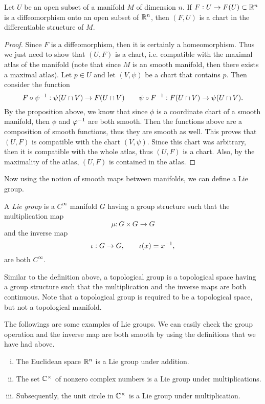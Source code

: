 \begin{proposition}
	Let $ U $ be an open subset of a manifold $ M $ of dimension $ n $. If $ F: U \to F(U) \subset \mathbb{R}^n $ is a diffeomorphism onto an open subset of $ \mathbb{R}^n $, then $ (F,U) $ is a chart in the differentiable structure of $ M $.
\end{proposition}
\begin{proof}
	Since $ F $ is a diffeomorphism, then it is certainly a homeomorphism. 
	Thus we just need to show that $ (U,F) $ is a chart, i.e. compatible with the maximal atlas of the manifold (note that since $ M $ is an smooth manifold, then there exists a maximal atlas). Let $ p \in  U $ and let $ (V,\psi) $ be a chart that contains $ p $. Then consider the function
	\[ F \circ \psi^{-1}: \psi(U\cap V) \to F(U\cap V) \qquad \psi\circ F^{-1}: F(U\cap V) \to \psi(U\cap V). \]
	By the proposition above, we know that since $ \phi $ is a coordinate chart of a smooth manifold, then $ \phi $ and $ \varphi^{-1} $ are both smooth. Then the functions above are a composition of smooth functions, thus they are smooth as well. This proves that $ (U,F) $ is compatible with the chart $ (V,\psi) $. Since this chart was arbitrary, then it is compatible with the whole atlas, thus $ (U,F) $ is a chart. Also, by the maximality of the atlas, $  (U,F) $ is contained in the atlas.
\end{proof}

Now using the notion of smooth maps between manifolds, we can define a Lie group.
\begin{definition}
	A \emph{Lie group} is a $ C^\infty $ manifold $ G $ having a group structure such that the multiplication map
	\[ \mu: G\times G \to G \]
	and the inverse map
	\[ \iota: G\to G, \qquad \iota(x) = x^{-1}, \]
	are both $ C^\infty $.
\end{definition}

\begin{remark}
	Similar to the definition above, a topological group is a topological space having a group structure such that the multiplication and the inverse maps are both continuous. Note that a topological group is required to be a topological space, but not a topological manifold.
\end{remark}

The followings are some examples of Lie groups. We can easily check the group operation and the inverse map are both smooth by using the definitions that we have had above.

\begin{enumerate}[(i)]
	\item The Euclidean space $ \mathbb{R}^n $ is a Lie group under addition.
	\item The set $ \mathbb{C}^{\times} $ of nonzero complex numbers is a Lie group under multiplications.
	\item Subsequently, the unit circle in $ \mathbb{C}^\times $ is a Lie group under multiplication.
\end{enumerate}


